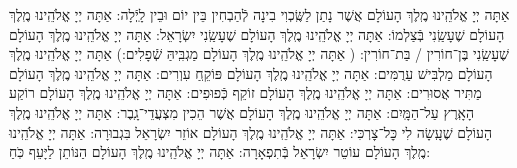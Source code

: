 \documentclass[twoside, openany, parskip=half, 11pt]{book}
\begin{document}
אַתָּה יְיָ אֱלֹהֵֽינוּ מֶֽלֶךְ הָעוֹלָם אֲשֶׁר נָתַן לַשֶּֽׂכְוִי בִינָה לְֿהַבְחִין בֵּין יוֹם וּבֵין לָֽיְֿלָה:
%
אַתָּה יְיָ אֱלֹהֵֽינוּ מֶֽלֶךְ הָעוֹלָם שֶׁעָשַֽׂנִי בְּֿצַלְמוֹ:\hfill \break
{}
אַתָּה יְיָ אֱלֹהֵֽינוּ מֶֽלֶךְ הָעוֹלָם שֶׁעָשַֽׂנִי יִשְׂרָאֵל:\hfill \break
{}
אַתָּה יְיָ אֱלֹהֵֽינוּ מֶֽלֶךְ הָעוֹלָם שֶׁעָשַֽׂנִי בֶּן־חוֹרִין / בַּת־חוֹרִין:\hfill \break
(
אַתָּה יְיָ אֱלֹהֵֽינוּ מֶֽלֶךְ הָעוֹלָם מַגְבִּֽיהַּ שְֿׁפָלִים:)\hfill \break
{}
אַתָּה יְיָ אֱלֹהֵֽינוּ מֶֽלֶךְ הָעוֹלָם מַלְבִּישׁ עַרֻמִּים:\hfill \break
\hspace*{1em} 
אַתָּה יְיָ אֱלֹהֵֽינוּ מֶֽלֶךְ הָעוֹלָם פּוֹקֵֽחַ עִוְרִים:\hfill \break
{}
אַתָּה יְיָ אֱלֹהֵֽינוּ מֶֽלֶךְ הָעוֹלָם מַתִּיר אֲסוּרִים:\hfill \break
{}
אַתָּה יְיָ אֱלֹהֵֽינוּ מֶֽלֶךְ הָעוֹלָם זוֹקֵף כְּֿפוּפִים:\hfill \break
{}
אַתָּה יְיָ אֱלֹהֵֽינוּ מֶֽלֶךְ הָעוֹלָם רוֹקַע הָאָֽרֶץ עַל־הַמָּֽיִם:\hfill \break
{}
אַתָּה יְיָ אֱלֹהֵֽינוּ מֶֽלֶךְ הָעוֹלָם אֲשֶׁר הֵכִין מִצְעֲדֵי־גָֽבֶר:\hfill \break
{}
אַתָּה יְיָ אֱלֹהֵֽינוּ מֶֽלֶךְ הָעוֹלָם שֶׁעָֽשָׂה לִי כׇּל־צׇרְכִּי:\hfill \break
{}
אַתָּה יְיָ אֱלֹהֵֽינוּ מֶֽלֶךְ הָעוֹלָם אוֹזֵר יִשְׂרָאֵל בִּגְבוּרָה:\hfill \break
{}
אַתָּה יְיָ אֱלֹהֵֽינוּ מֶֽלֶךְ הָעוֹלָם עוֹטֵר יִשְׂרָאֵל בְּֿתִפְאָרָה:\hfill \break
{}
אַתָּה יְיָ אֱלֹהֵֽינוּ מֶֽלֶךְ הָעוֹלָם הַנּוֹתֵן לַיָּעֵף כֹּֽחַ:\hfill \break
\end{document}
